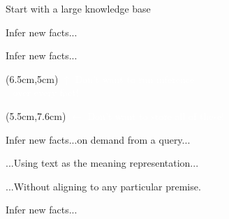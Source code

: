 \begin{frame}[noframenumbering]{Start with a large knowledge base}
\begin{center}
  \teaserManyPremises
\end{center}
\end{frame}

\begin{frame}[noframenumbering]{Infer new facts...}
\begin{center}
  \teaserBlindInferenceNaturalOrderBlind
\end{center}
\end{frame}

\begin{frame}[noframenumbering]{Infer new facts...}
\begin{center}
  \teaserBlindInferenceNaturalOrder
\end{center}
\pause
\begin{textblock*}{6.0cm}(6.5cm,5cm)
  \textcolor<1-1>{white}{$\uparrow$ Don't want to run inference \\ $~~$ over every fact!}
\end{textblock*}
\pause
\begin{textblock*}{6cm}(5.5cm,7.6cm)
  \textcolor<1-2>{white}{$\leftarrow$ Don't want to store all of these!}
\end{textblock*}
\end{frame}

\begin{frame}[noframenumbering]{Infer new facts...on demand from a query...}
\begin{center}
  \teaserBlindInference
\end{center}
\end{frame}

\begin{frame}[noframenumbering]{...Using text as the meaning representation...}
\begin{center}
  \teaserInference
\end{center}
\end{frame}

\begin{frame}[noframenumbering]{...Without aligning to any particular premise.}
\begin{center}
  \teaserFullDerivation
\end{center}
\end{frame}

\begin{frame}[noframenumbering]{Infer new facts...}
\begin{center}
  \teaserBlindInferenceNaturalOrder
\end{center}
\end{frame}

